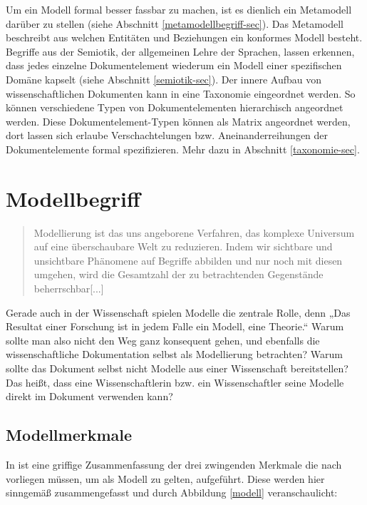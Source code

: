  
Um ein Modell formal besser fassbar zu machen, ist es dienlich ein Metamodell darüber zu stellen (siehe Abschnitt \ref{metamodellbegriff-sec}). Das Metamodell beschreibt aus welchen Entitäten und Beziehungen ein konformes Modell besteht. Begriffe aus der Semiotik, der allgemeinen Lehre der Sprachen, lassen erkennen, dass jedes einzelne Dokumentelement wiederum ein Modell einer spezifischen Domäne kapselt (siehe Abschnitt \ref{semiotik-sec}). Der innere Aufbau von wissenschaftlichen Dokumenten kann in eine Taxonomie eingeordnet werden. So können verschiedene Typen von Dokumentelementen hierarchisch angeordnet werden. Diese Dokumentelement-Typen können als Matrix angeordnet werden, dort lassen sich erlaube Verschachtelungen bzw. Aneinanderreihungen der Dokumentelemente formal spezifizieren. Mehr dazu in Abschnitt \ref{taxonomie-sec}.

 
\section{Modellbegriff}\label{modellbegriff-sec}
 
\begin{quote}
 Modellierung ist das uns angeborene Verfahren, das komplexe Universum auf eine überschaubare Welt zu reduzieren. Indem wir sichtbare und unsichtbare Phänomene auf Begriffe abbilden und nur noch mit diesen umgehen, wird die Gesamtzahl der zu betrachtenden Gegenstände beherrschbar[...] \citep[S.~7]{Ludewig}
\end{quote}
 
Gerade auch in der Wissenschaft spielen Modelle die zentrale Rolle, denn „Das Resultat einer Forschung ist in jedem Falle ein Modell, eine Theorie.“ \citep[S.~8]{Ludewig} Warum sollte man also nicht den Weg ganz konsequent gehen, und ebenfalls die wissenschaftliche Dokumentation selbst als Modellierung betrachten? Warum sollte das Dokument selbst nicht Modelle aus einer Wissenschaft bereitstellen? Das heißt, dass eine Wissenschaftlerin bzw. ein Wissenschaftler seine Modelle direkt im Dokument verwenden kann?

 
\subsection{Modellmerkmale}\label{modellmerkmale}
 
In \citep[S.~9]{Ludewig} ist eine griffige Zusammenfassung der drei zwingenden Merkmale die nach \citep{Stachowiak} vorliegen müssen, um als Modell zu gelten, aufgeführt. Diese werden hier sinngemäß zusammengefasst und durch Abbildung \ref{modell} veranschaulicht:

